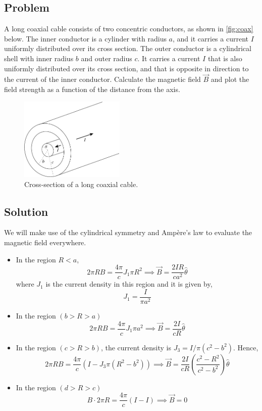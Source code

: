 \documentclass[solutions]{esg8022pset}
\begin{document}
\subsection{Problem}
  A long coaxial cable consists of two concentric conductors, as shown in
  \autoref{fig:coax} below.  The inner conductor is a cylinder with radius $a$,
  and it carries a current $I$ uniformly distributed over its cross section.
  The outer conductor is a cylindrical shell with inner radius $b$ and outer
  radius $c$. It carries a current $I$ that is also uniformly distributed over
  its cross section, and that is opposite in direction to the current of the
  inner conductor.  Calculate the magnetic field $\vec{B}$  and plot the field
  strength as a function of the distance from the axis.
  \begin{figure}[H]
    \centering
    \includegraphics[width = 5cm]{coax}
    \caption{Cross-section of a long coaxial cable.}
    \label{fig:coax}
  \end{figure}
\subsection{Solution}
  We will make use of the cylindrical symmetry and Amp\`{e}re's law to evaluate the magnetic field everywhere.
  \begin{itemize}
    \item In the region $R<a$,
      $$2\pi R B = \frac{4\pi}{c} J_1\pi R^2 \implies \vec{B} = \frac{2IR}{ca^2}\hat{\theta}$$
      where $J_1$ is the current density in this region and it is given by,
      $$J_{1} = \frac{I}{\pi a^{2}}$$
    \item
      In the region $(b > R > a)$ $$  2\pi R B = \frac{4\pi}{c} J_1\pi a^2
      \implies \vec{B} = \frac{2I}{cR}\hat{\theta}$$
    \item
      In the region $(c > R > b)$, the current density is $J_{3} = I/\pi ( c^2 - b^2 )$. Hence,
      $$2\pi R B = \frac{4\pi}{c} ( I  -
      J_3\pi(R^2-b^2)) \implies \vec{B} =
      \frac{2I}{cR}\left(\frac{c^2 - R^2}{c^2 -b^2}\right)\hat{\theta}$$
    \item
      In the region $(d > R > c)$ $$ B\cdot 2\pi R = \frac{4\pi}{c} ( I - I) \implies \vec{B} = 0 $$
  \end{itemize}
\end{document}
